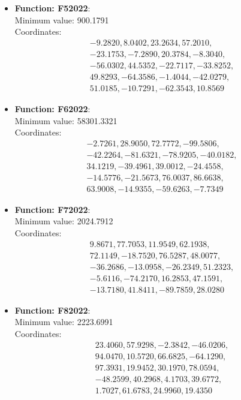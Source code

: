 \documentclass{article}
\begin{document}
\begin{itemize}
  \item \textbf{Function: F52022}: \\
    Minimum value: 900.1791 \\
    Coordinates:
    \[
      \begin{aligned}
        & -9.2820, 8.0402, 23.2634, 57.2010, \\
        & -23.1753, -7.2890, 20.3784, -8.3040, \\
        & -56.0302, 44.5352, -22.7117, -33.8252, \\
        & 49.8293, -64.3586, -1.4044, -42.0279, \\
        & 51.0185, -10.7291, -62.3543, 10.8569
      \end{aligned}
    \]

  \item \textbf{Function: F62022}: \\
    Minimum value: 58301.3321 \\
    Coordinates:
    \[
      \begin{aligned}
        & -2.7261, 28.9050, 72.7772, -99.5806, \\
        & -42.2264, -81.6321, -78.9205, -40.0182, \\
        & 34.1219, -39.4961, 39.0012, -24.4558, \\
        & -14.5776, -21.5673, 76.0037, 86.6638, \\
        & 63.9008, -14.9355, -59.6263, -7.7349
      \end{aligned}
    \]

  \item \textbf{Function: F72022}: \\
    Minimum value: 2024.7912 \\
    Coordinates:
    \[
      \begin{aligned}
        & 9.8671, 77.7053, 11.9549, 62.1938, \\
        & 72.1149, -18.7520, 76.5287, 48.0077, \\
        & -36.2686, -13.0958, -26.2349, 51.2323, \\
        & -5.6116, -74.2170, 16.2853, 47.1591, \\
        & -13.7180, 41.8411, -89.7859, 28.0280
      \end{aligned}
    \]

  \item \textbf{Function: F82022}: \\
    Minimum value: 2223.6991 \\
    Coordinates:
    \[
      \begin{aligned}
        & 23.4060, 57.9298, -2.3842, -46.0206, \\
        & 94.0470, 10.5720, 66.6825, -64.1290, \\
        & 97.3931, 19.9452, 30.1970, 78.0594, \\
        & -48.2599, 40.2968, 4.1703, 39.6772, \\
        & 1.7027, 61.6783, 24.9960, 19.4350
      \end{aligned}
    \]


\end{itemize}
\end{document}
